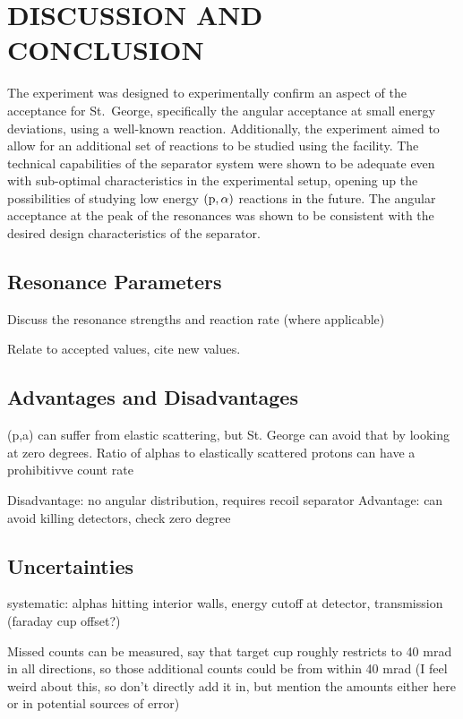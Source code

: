 \chapter{DISCUSSION AND CONCLUSION}
\label{ch:discussion-and-conclusion}

The experiment was designed to experimentally confirm an aspect of the
acceptance for St.\ George, specifically the angular acceptance at small
energy deviations, using a well-known reaction. Additionally, the
experiment aimed to allow for an additional set of reactions to be
studied using the facility. The technical capabilities of the separator
system were shown to be adequate even with sub-optimal characteristics
in the experimental setup, opening up the possibilities of studying low
energy $(\rm{p},\alpha)$ reactions in the future. The angular acceptance at the
peak of the resonances was shown to be consistent with the desired design
characteristics of the separator.


\section{Resonance Parameters}
Discuss the resonance strengths and reaction rate (where applicable)

Relate to accepted values, cite new values.


\section{Advantages and Disadvantages}
(p,a) can suffer from elastic scattering, but St. George can avoid that by
looking at zero degrees. Ratio of alphas to elastically scattered protons
can have a prohibitivve count rate

Disadvantage: no angular distribution, requires recoil separator
Advantage: can avoid killing detectors, check zero degree


\section{Uncertainties}
\label{sec:uncertainties}


systematic: alphas hitting interior walls, energy cutoff at detector,
transmission (faraday cup offset?)

Missed counts can be measured, say that target cup roughly restricts to 40 mrad
in all directions, so those additional counts could be from within 40 mrad (I
feel weird about this, so don't directly add it in, but mention the amounts
either here or in potential sources of error)

